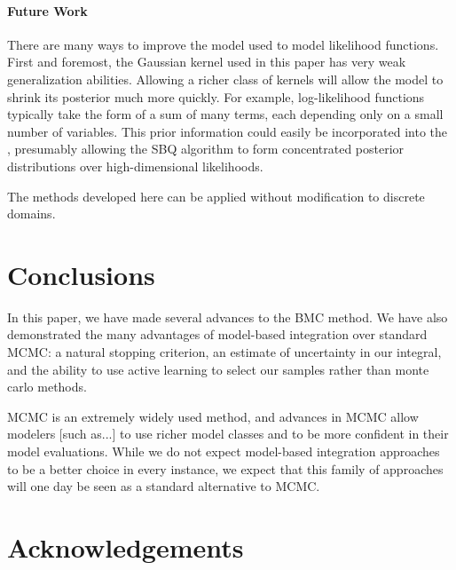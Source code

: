 \documentclass{article}
\begin{document}
\paragraph{Future Work}There are many ways to improve the \gpb model used to model likelihood functions.  First and foremost, the Gaussian kernel used in this paper has very weak generalization abilities.  Allowing a richer class of kernels will allow the \gpb model to shrink its posterior much more quickly.  For example, log-likelihood functions typically take the form of a sum of many terms, each depending only on a small number of variables.  This prior information could easily be incorporated into the \gpb, presumably allowing the SBQ algorithm to form concentrated posterior distributions over high-dimensional likelihoods.

The methods developed here can be applied without modification to discrete domains.

\section{Conclusions}

 In this paper, we have made several advances to the BMC method.  We have also demonstrated the many advantages of model-based integration over standard MCMC: a natural stopping criterion, an estimate of uncertainty in our integral, and the ability to use active learning to select our samples rather than monte carlo methods.

MCMC is an extremely widely used method, and advances in MCMC allow modelers [such as...] to use richer model classes and to be more confident in their model evaluations.  While we do not expect model-based integration approaches to be a better choice in every instance, we expect that this family of approaches will one day be seen as a standard alternative to MCMC.

\section*{Acknowledgements}



\end{document}
